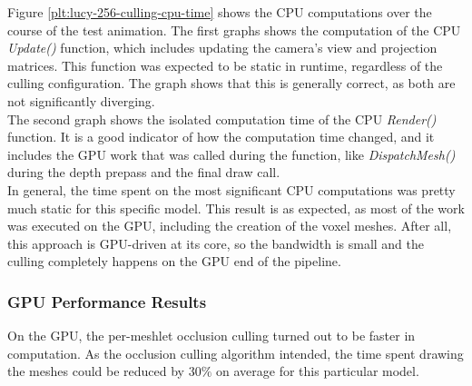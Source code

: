 \noindent
Figure \ref{plt:lucy-256-culling-cpu-time} shows the \ac{CPU} computations over the course of the test animation.
The first graphs shows the computation of the \ac{CPU} \emph{Update()} function, which includes updating the camera's 
view and projection matrices. This function was expected to be static in runtime, regardless of the culling configuration. 
The graph shows that this is generally correct, as both are not significantly diverging.\\

\noindent
The second graph shows the isolated computation time of the \ac{CPU} \emph{Render()} function. It is a good indicator of 
how the computation time changed, and it includes the \ac{GPU} work that was called during the function, like 
\emph{DispatchMesh()} during the depth prepass and the final draw call. \\

\noindent
In general, the time spent on the most significant \ac{CPU} computations was pretty much static for this specific 
model. This result is as expected, as most of the work was executed on the \ac{GPU}, including the creation of the 
voxel meshes. After all, this approach is \ac{GPU}-driven at its core, so the bandwidth is small and the culling 
completely happens on the \ac{GPU} end of the pipeline.

\subsubsection*{GPU Performance Results} \label{subsubsec-gpu-performance-results-lucy}

On the \ac{GPU}, the per-meshlet occlusion culling turned out to be faster in computation. As the occlusion 
culling algorithm intended, the time spent drawing the meshes could be reduced by $30\%$ on average for this 
particular model.

